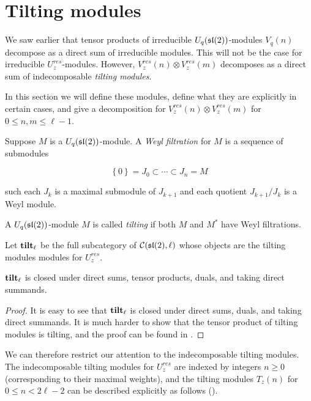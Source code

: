 \section{Tilting modules} 

We saw earlier that tensor products of irreducible $U_q(\mathfrak{sl}(2))$-modules
$V_q(n)$ decompose as a direct sum of irreducible modules. This will not be the
case for irreducible $U_z^{res}$-modules. However, $V_z^{res}(n)\otimes
V_z^{res}(m)$ decomposes as a direct sum of indecomposable \emph{tilting
modules}. 

In this section we will define these modules, define what they are explicitly
in certain cases, and give a decomposition for $V^{res}_z(n) \otimes
V_z^{res}(m)$ for $0 \leq n,m \leq \ell - 1$.

\begin{defn}
    Suppose $M$ is a $U_q(\mathfrak{sl}(2))$-module. A \emph{Weyl filtration} for $M$
    is a sequence of submodules 

    \begin{equation}
        \left\{ 0 \right\} = J_0 \subset \cdots \subset J_n = M
    \end{equation}

    such each $J_k$ is a maximal submodule of $J_{k+1}$ and each quotient $J_{k+1}/J_k$ is a Weyl module. 
\end{defn}

\begin{defn}
    A $U_q(\mathfrak{sl}(2))$-module $M$ is called \emph{tilting} if both $M$ and $M^*$ have Weyl filtrations.
\end{defn}

Let $\mathbf{tilt}_\ell$ be the full subcategory of $\mathcal{C}(\mathfrak{sl}(2), \ell)$ whose
objects are the tilting modules modules for $U_z^{res}$.  

\begin{prop}
    $\mathbf{tilt}_\ell$ is closed under direct sums, tensor products, duals, and taking direct summands.
\end{prop}
\begin{proof}
    It is easy to see that $\mathbf{tilt}_\ell$ is closed under direct sums, duals, and
    taking direct summands. It is much harder to show that the tensor product
    of tilting modules is tilting, and the proof can be found in \cite{Andersen1992}.
\end{proof}

We can therefore restrict our attention to the indecomposable tilting modules.
The indecomposable tilting modules for $U_z^{res}$ are indexed by integers $n
\geq 0$ (corresponding to their maximal weights), and the tilting modules
$T_z(n)$ for $0 \leq n < 2\ell - 2$ can be described explicitly as follows
(\cite{CP}). 

